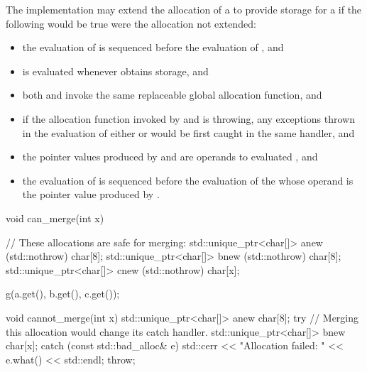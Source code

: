 \pnum
The implementation may
extend the allocation of a   to provide
storage for a   if the
following would be true were the allocation not extended:
\begin{itemize}
\item the evaluation of  is sequenced before the evaluation of
, and

\item {} is evaluated whenever  obtains storage, and

\item both  and  invoke the same replaceable global
allocation function, and

\item if the allocation function invoked by  and  is
throwing, any exceptions thrown in the evaluation of either  or
 would be first caught in the same handler, and

\item the pointer values produced by  and  are operands to
evaluated , and

\item the evaluation of  is sequenced before the evaluation of the
 whose operand is the pointer value produced
by .
\end{itemize}

\begin{example}
\begin{codeblock}
void can_merge(int x) {
  // These allocations are safe for merging:
  std::unique_ptr<char[]> a{new (std::nothrow) char[8]};
  std::unique_ptr<char[]> b{new (std::nothrow) char[8]};
  std::unique_ptr<char[]> c{new (std::nothrow) char[x]};

  g(a.get(), b.get(), c.get());
}

void cannot_merge(int x) {
  std::unique_ptr<char[]> a{new char[8]};
  try {
    // Merging this allocation would change its catch handler.
    std::unique_ptr<char[]> b{new char[x]};
  } catch (const std::bad_alloc& e) {
    std::cerr << "Allocation failed: " << e.what() << std::endl;
    throw;
  }
}
\end{codeblock}
\end{example}

